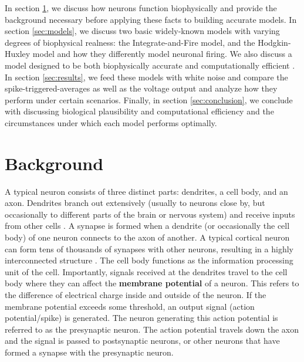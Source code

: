 \documentclass[11pt]{article}
\begin{document}
In section \ref{sec:background}, we discuss how neurons function biophysically and provide the background necessary before applying these facts to building accurate models. In section \ref{sec:models}, we discuss two basic widely-known models with varying degrees of biophysical realness: the Integrate-and-Fire model, and the Hodgkin-Huxley model and how they differently model neuronal firing. We also discuss a model designed to be both biophysically accurate and computationally efficient \citep{izhikevich_model}. In section \ref{sec:results}, we feed these models with white noise and compare the spike-triggered-averages as well as the voltage output and analyze how they perform under certain scenarios. Finally, in section \ref{sec:conclusion}, we conclude with discussing biological plausibility and computational efficiency and the circumstances under which each model performs optimally.

\section{Background}
\label{sec:background}
A typical neuron consists of three distinct parts: dendrites, a cell body, and an axon. Dendrites branch out extensively (usually to neurons close by, but occasionally to different parts of the brain or nervous system) and receive inputs from other cells \citep{neuroscience_2nd_edition}. A synapse is formed when a dendrite (or occasionally the cell body) of one neuron connects to the axon of another. A typical cortical neuron can form tens of thousands of synapses with other neurons, resulting in a highly interconnected structure \citep{neuronal_dynamics}. The cell body functions as the information processing unit of the cell. Importantly, signals received at the dendrites travel to the cell body where they can affect the \textbf{membrane potential} of a neuron. This refers to the difference of electrical charge inside and outside of the neuron. If the membrane potential exceeds some threshold, an output signal (action potential/spike) is generated. The neuron generating this action potential is referred to as the presynaptic neuron. The action potential travels down the axon and the signal is passed to postsynaptic neurons, or other neurons that have formed a synapse with the presynaptic neuron.
\end{document}

